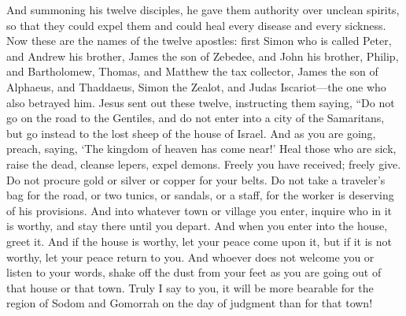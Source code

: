 \begin{biblechapter} %
 And summoning his twelve disciples, he gave them authority over unclean spirits, so that they could expel them and could heal every disease and every sickness.
\verse Now these are the names of the twelve apostles: first Simon who is called Peter, and Andrew his brother, James the son of Zebedee, and John his brother,
\verse Philip, and Bartholomew, Thomas, and Matthew the tax collector, James the son of Alphaeus, and Thaddaeus,
\verse Simon the Zealot, and Judas Iscariot—the one who also betrayed him.
\verse Jesus sent out these twelve, instructing them saying, “Do not go on the road to the Gentiles, and do not enter into a city of the Samaritans,
\verse but go instead to the lost sheep of the house of Israel.
\verse And as you are going, preach, saying, ‘The kingdom of heaven has come near!’
\verse Heal those who are sick, raise the dead, cleanse lepers, expel demons. Freely you have received; freely give.
\verse Do not procure gold or silver or copper for your belts.
\verse Do not take a traveler’s bag for the road, or two tunics, or sandals, or a staff, for the worker is deserving of his provisions.
\verse And into whatever town or village you enter, inquire who in it is worthy, and stay there until you depart.
\verse And when you enter into the house, greet it.
\verse And if the house is worthy, let your peace come upon it, but if it is not worthy, let your peace return to you.
\verse And whoever does not welcome you or listen to your words, shake off the dust from your feet as you are going out of that house or that town.
\verse Truly I say to you, it will be more bearable for the region of Sodom and Gomorrah on the day of judgment than for that town!

\end{biblechapter}
